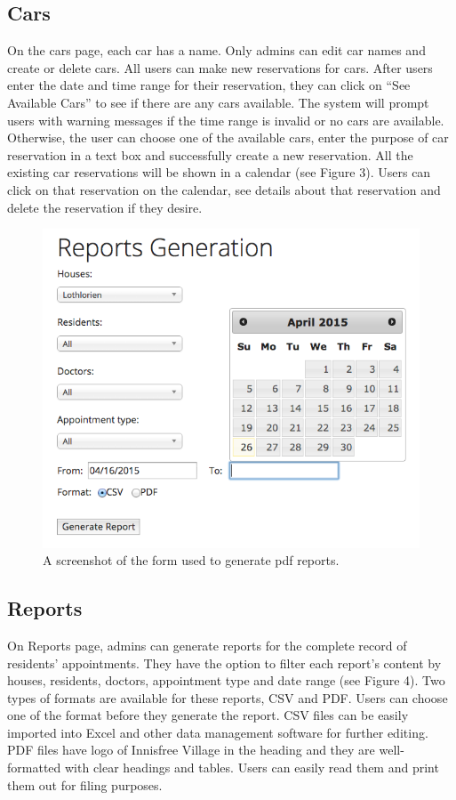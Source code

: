 \documentclass{sig-alternate}
\begin{document}
\subsection{Cars}
On the cars page, each car has a name. Only admins can edit car names and create or delete cars. All users can make new reservations for cars. After users enter the date and time range for their reservation, they can click on “See Available Cars” to see if there are any cars available. The system will prompt users with warning messages if the time range is invalid or no cars are available. Otherwise, the user can choose one of the available cars, enter the purpose of car reservation in a text box and successfully create a new reservation. All the existing car reservations will be shown in a calendar (see Figure 3). Users can click on that reservation on the calendar, see details about that reservation and delete the reservation if they desire. 

\begin{figure}
\includegraphics[scale=0.4]{ReportGeneration}
\caption{A screenshot of the form used to generate pdf reports.}
\end{figure}

\subsection{Reports}
On Reports page, admins can generate reports for the complete record of residents' appointments. They have the option to filter each report's content by houses, residents, doctors, appointment type and date range (see Figure 4). Two types of formats are available for these reports, CSV and PDF. Users can choose one of the format before they generate the report. CSV files can be easily imported into Excel and other data management software for further editing. PDF files have logo of Innisfree Village in the heading and they are well-formatted with clear headings and tables. Users can easily read them and print them out for filing purposes. 
\end{document}
